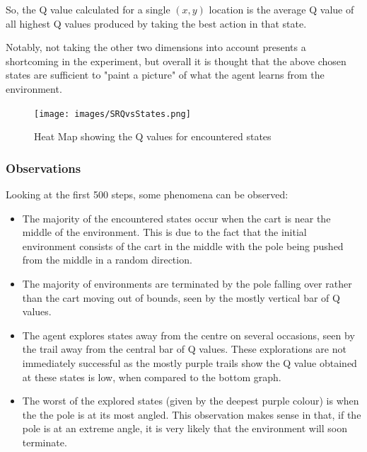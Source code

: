 \documentclass{article}
\begin{document}
So, the Q value calculated for a single $(x,y)$ location is the average Q value of all highest Q values produced by taking the best action in that state. 

Notably, not taking the other two dimensions into account presents a shortcoming in the experiment, but overall it is thought that the above chosen states are sufficient to "paint a picture" of what the agent learns from the environment. 

\begin{figure}[H]
    \hspace*{-3cm}
    \texttt{[image: images/SRQvsStates.png]}
    \caption{Heat Map showing the Q values for encountered states}
    \label{fig:SRQvsStates}
\end{figure}

\newpage

\subsubsection{Observations}

Looking at the first 500 steps, some phenomena can be observed:

\begin{itemize}
    \item The majority of the encountered states occur when the cart is near the middle of the environment. This is due to the fact that the initial environment consists of the cart in the middle with the pole being pushed from the middle in a random direction.
    
    \item The majority of environments are terminated by the pole falling over rather than the cart moving out of bounds, seen by the mostly vertical bar of Q values. 
    
    \item The agent explores states away from the centre on several occasions, seen by the trail away from the central bar of Q values. These explorations are not immediately successful as the mostly purple trails show the Q value obtained at these states is low, when compared to the bottom graph. 
    
    \item The worst of the explored states (given by the deepest purple colour) is when the the pole is at its most angled. This observation makes sense in that, if the pole is at an extreme angle, it is very likely that the environment will soon terminate. 
    
\end{itemize}
\end{document}
